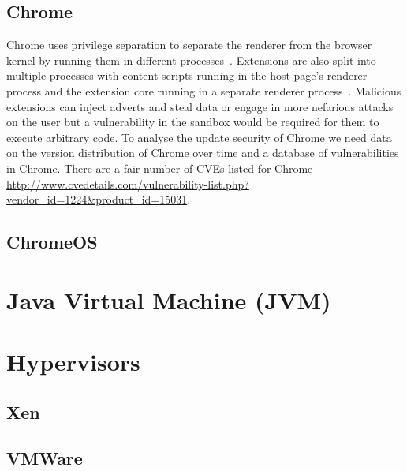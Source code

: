 \documentclass[12pt,a4paper]{article}
\begin{document}
\subsection{Chrome}
Chrome uses privilege separation to separate the renderer from the browser kernel by running them in different processes~\cite{Barth2008}.
Extensions are also split into multiple processes with content scripts running in the host page's renderer process and the extension core running in a separate renderer process~\cite{Liu2012}.
Malicious extensions can inject adverts and steal data or engage in more nefarious attacks on the user but a vulnerability in the sandbox would be required for them to execute arbitrary code.
To analyse the update security of Chrome we need data on the version distribution of Chrome over time and a database of vulnerabilities in Chrome.
There are a fair number of CVEs listed for Chrome \url{http://www.cvedetails.com/vulnerability-list.php?vendor_id=1224&product_id=15031}.

\subsection{ChromeOS}


\section{Java Virtual Machine (JVM)}

\section{Hypervisors}
\subsection{Xen}
\subsection{VMWare}

\printbibliography
\end{document}
